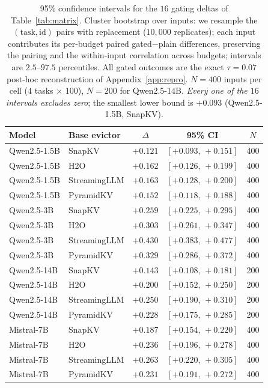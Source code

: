 \documentclass{article}
\begin{document}
\begin{table}[t]
\centering
\caption{95\% confidence intervals for the $16$ gating deltas of
Table~\ref{tab:matrix}. Cluster bootstrap over inputs: we resample the
$(\text{task}, \text{id})$ pairs with replacement ($10{,}000$ replicates);
each input contributes its per-budget paired gated$-$plain differences,
preserving the pairing and the within-input correlation across budgets;
intervals are $2.5$--$97.5$ percentiles. All gated outcomes are the exact
$\tau = 0.07$ post-hoc reconstruction of Appendix~\ref{app:repro}.
$N = 400$ inputs per cell ($4$ tasks $\times$ $100$), $N = 200$ for
Qwen2.5-14B. \emph{Every one of the $16$ intervals excludes zero}; the
smallest lower bound is $+0.093$ (Qwen2.5-1.5B, SnapKV).}
\label{tab:matrix-ci}
\begin{tabular}{llccc}
\toprule
Model & Base evictor & $\Delta$ & 95\% CI & $N$ \\
\midrule
Qwen2.5-1.5B & SnapKV       & $+0.121$ & $[+0.093,\,+0.151]$ & 400 \\
Qwen2.5-1.5B & H2O          & $+0.162$ & $[+0.126,\,+0.199]$ & 400 \\
Qwen2.5-1.5B & StreamingLLM & $+0.163$ & $[+0.128,\,+0.200]$ & 400 \\
Qwen2.5-1.5B & PyramidKV    & $+0.152$ & $[+0.118,\,+0.188]$ & 400 \\
\midrule
Qwen2.5-3B   & SnapKV       & $+0.259$ & $[+0.225,\,+0.295]$ & 400 \\
Qwen2.5-3B   & H2O          & $+0.303$ & $[+0.261,\,+0.347]$ & 400 \\
Qwen2.5-3B   & StreamingLLM & $+0.430$ & $[+0.383,\,+0.477]$ & 400 \\
Qwen2.5-3B   & PyramidKV    & $+0.329$ & $[+0.286,\,+0.372]$ & 400 \\
\midrule
Qwen2.5-14B  & SnapKV       & $+0.143$ & $[+0.108,\,+0.181]$ & 200 \\
Qwen2.5-14B  & H2O          & $+0.200$ & $[+0.152,\,+0.250]$ & 200 \\
Qwen2.5-14B  & StreamingLLM & $+0.250$ & $[+0.190,\,+0.310]$ & 200 \\
Qwen2.5-14B  & PyramidKV    & $+0.228$ & $[+0.175,\,+0.285]$ & 200 \\
\midrule
Mistral-7B   & SnapKV       & $+0.187$ & $[+0.154,\,+0.220]$ & 400 \\
Mistral-7B   & H2O          & $+0.236$ & $[+0.196,\,+0.278]$ & 400 \\
Mistral-7B   & StreamingLLM & $+0.263$ & $[+0.220,\,+0.305]$ & 400 \\
Mistral-7B   & PyramidKV    & $+0.231$ & $[+0.191,\,+0.272]$ & 400 \\
\bottomrule
\end{tabular}
\end{table}
\end{document}
